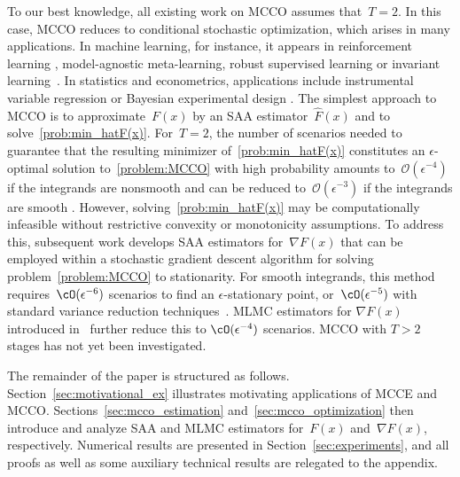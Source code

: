\documentclass[11pt]{article}
\let\hat\widehat
\begin{document}
To our best knowledge, all existing work on MCCO assumes that~$T=2$. In this case, MCCO reduces to conditional stochastic optimization, which arises in many applications. In machine learning, for instance, it appears in reinforcement learning \citep{dai2018sbeed, hu2020sample}, model-agnostic meta-learning, robust supervised learning or invariant learning~\citep{hu2020sample, hu2021bias}. In statistics and econometrics, applications include instrumental variable regression \citep{bennett2019deep, goda2023constructing, hartford2017deep, muandet2020dual, singh2019kernel,chen2024stochastic} or Bayesian experimental design \citep{goda2020multilevel, goda2022unbiased, beck2020multilevel}. The simplest approach to MCCO is to approximate~$F(x)$ by an SAA estimator~$\hat F(x)$ and to solve~\eqref{prob:min_hatF(x)}. For~$T=2$, the number of scenarios needed to guarantee that the resulting minimizer of~\eqref{prob:min_hatF(x)} constitutes an $\epsilon$-optimal solution to~\eqref{problem:MCCO} with high probability amounts to~$\mathcal{O}(\epsilon^{-4})$ if the integrands are nonsmooth and can be reduced to~$\mathcal{O}(\epsilon^{-3})$ if the integrands are smooth \citep{hu2020sample}. However, solving~\eqref{prob:min_hatF(x)} may be computationally infeasible without restrictive convexity or monotonicity assumptions. To address this, subsequent work develops SAA estimators for~$\nabla F(x)$ that can be employed within a stochastic gradient descent algorithm for solving problem~\eqref{problem:MCCO} to stationarity. For smooth integrands, this method requires~$\cO(\epsilon^{-6})$ scenarios to find an $\epsilon$-stationary point, or~$\cO(\epsilon^{-5})$ with standard variance reduction techniques~\citep{hu2020biased}. MLMC estimators for $\nabla F(x)$ introduced in~\citep{hu2024multi} further reduce this to $\cO(\epsilon^{-4})$ scenarios. MCCO with $T>2$ stages has not yet been investigated.


The remainder of the paper is structured as follows. Section~\ref{sec:motivational_ex} illustrates motivating applications of MCCE and MCCO. Sections~\ref{sec:mcco_estimation} and~\ref{sec:mcco_optimization} then introduce and analyze SAA and MLMC estimators for~$F(x)$ and~$\nabla F(x)$, respectively. Numerical results are presented in Section~\ref{sec:experiments}, and all proofs as well as some auxiliary technical results are relegated to the appendix.
\end{document}
